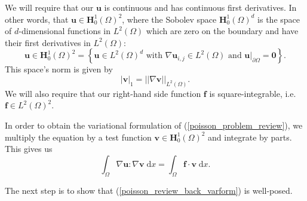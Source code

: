 \documentclass[12pt,a4paper]{article}
\theoremstyle{definition}
\begin{document}
We will require that our $\textbf{u}$ is continuous and has continuous first derivatives. 
 In other words, that $\textbf{u}\in \textbf{H}^1_0\left(\Omega\right)^2$, where the Sobolev space $\textbf{H}^1_0\left(\Omega\right)^d$ is  the space of $d$-dimensional functions in $L^2\left(\Omega\right)$ which are zero on the boundary and have their first derivatives in $L^2\left(\Omega\right)$:
\begin{equation}
\textbf{u}\in \textbf{H}^1_0\left(\Omega\right)^2 = \left\lbrace \textbf{u}\in L^2\left(\Omega\right)^d \text{ with } \nabla\textbf{u}_{i,j}\in L^2\left(\Omega\right) \text{ and } \textbf{u}|_{\partial\Omega}=\textbf{0}\right\rbrace. \nonumber
\end{equation}
This space's norm is given by 
\begin{equation}
\left|\textbf{v}\right|_{1}=\left|\left|\nabla\textbf{v}\right|\right|_{L^2\left(\Omega\right)}.\nonumber
\end{equation}
 We will also require that our right-hand side function $\textbf{f}$ is square-integrable, i.e. $\textbf{f}\in L^2\left(\Omega\right)^2$.
 
In order to obtain the variational formulation of (\ref{poisson_problem_review}), we multiply the equation by a test function $\textbf{v}\in \textbf{H}^1_0\left(\Omega\right)^2$ and integrate by parts.  This gives us
\begin{equation}
\int_{\Omega}\nabla \textbf{u} : \nabla \textbf{v}\;\mathrm{d}x  =\int_{\Omega}\textbf{f}\cdot \textbf{v} \;\mathrm{d}x.
\end{equation}

The next step is to show that (\ref{poisson_review_back_varform}) is well-posed.
\end{document}
